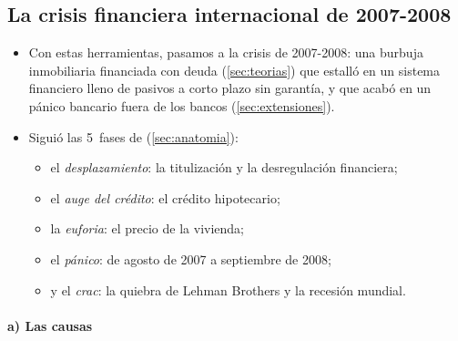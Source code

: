 \documentclass[11pt]{article}
\begin{document}
\subsection{La crisis financiera internacional de 2007-2008}\label{sec:crisis-2007}

\begin{itemize}
\item Con estas herramientas, pasamos a la crisis de 2007-2008: una burbuja inmobiliaria financiada con deuda (\ref{sec:teorias}) que estalló en un sistema financiero lleno de pasivos a corto plazo sin garantía, y que acabó en un pánico bancario fuera de los bancos (\ref{sec:extensiones}).
\item Siguió las 5~fases de  (\ref{sec:anatomia}):
  \begin{itemize}
  \item el \emph{desplazamiento}: la titulización y la desregulación financiera;
  \item el \emph{auge del crédito}: el crédito hipotecario;
  \item la \emph{euforia}: el precio de la vivienda;
  \item el \emph{pánico}: de agosto de 2007 a septiembre de 2008;
  \item y el \emph{crac}: la quiebra de Lehman Brothers y la recesión mundial.
  \end{itemize}
\end{itemize}

\paragraph{a) Las causas}
\end{document}
